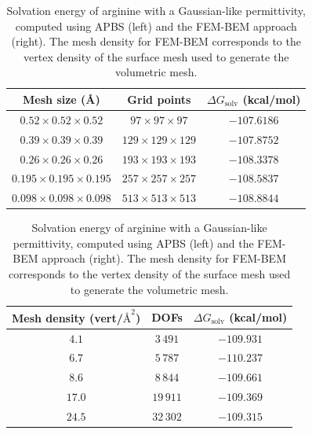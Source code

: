 \begin{table}
\centering
\footnotesize
\begin{tabular}{c|c|c}
Mesh size (\AA)  & Grid points & \parbox{2cm}{\centering$\Delta G_{\text{solv}}$\\(kcal/mol)}\\
\hline
$0.52\times0.52\times0.52$ & $97\times97\times97$ & $-107.6186$\\ 
$0.39\times0.39\times0.39$ & $129\times129\times129$ & $-107.8752$\\ 
$0.26\times0.26\times0.26$ & $193\times193\times193$ & $-108.3378$\\ 
$0.195\times0.195\times0.195$ & $257\times257\times257$ & $-108.5837$\\ 
$0.098\times0.098\times0.098$ & $513\times513\times513$ & $-108.8844$\\ 
\end{tabular}%
\hspace{3mm}%
\begin{tabular}{c|c|c}
\parbox{2.1cm}{\centering Mesh density\\(vert/$\text{\AA}^2$)}& DOFs & \parbox{2cm}{\centering$\Delta G_{\text{solv}}$\\(kcal/mol)}\\
\hline
$4.1$ & $3\,491$ & $-109.931$ \\
$6.7$ & $5\,787$ & $-110.237$ \\
$8.6$ & $8\,844$ & $-109.661$ \\
$17.0$ & $19\,911$ & $-109.369$ \\
$24.5$ & $32\,302$ & $-109.315$ \\
\end{tabular}
\caption{Solvation energy of arginine with a Gaussian-like permittivity, computed using APBS (left) and the FEM-BEM approach (right). The mesh density for FEM-BEM corresponds to the vertex density of the surface mesh used to generate the volumetric mesh.}
\label{table:arg_variable}
\end{table}

